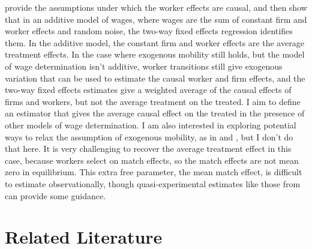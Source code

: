 \documentclass{article}
\begin{document}
\citet{abowd1999high} provide the assumptions under which the worker effects are causal, and then show that in an additive model of wages, where wages are the sum of constant firm and worker effects and random noise, the two-way fixed effects regression identifies them. In the additive model, the constant firm and worker effects are the average treatment effects. In the case where exogenous mobility still holds, but the model of wage determination isn't additive, worker transitions still give exogenous variation that can be used to estimate the causal worker and firm effects, and the two-way fixed effects estimates give a weighted average of the causal effects of firms and workers, but not the average treatment on the treated. I aim to define an estimator that gives the average causal effect on the treated in the presence of other models of wage determination. I am also interested in exploring potential ways to relax the assumption of exogenous mobility, as in \citet{abowd2019modeling} and \citet{bonhomme2019distributional}, but I don't do that here. It is very challenging to recover the average treatment effect in this case, because workers select on match effects, so the match effects are not mean zero in equilibrium. This extra free parameter, the mean match effect, is difficult to estimate observationally, though quasi-experimental estimates like those from \citet{gibbons1992does} can provide some guidance.%


\section{Related Literature}
\end{document}
